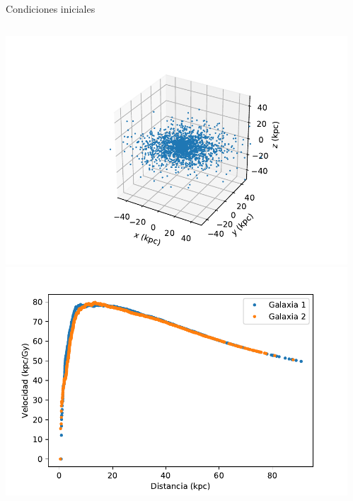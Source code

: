 \documentclass[handout]{beamer}
\begin{document}
\begin{frame}{Condiciones iniciales}
	\begin{columns}
		\begin{column}{0.5\textwidth}
			\includegraphics[height=0.35\textheight]{sources/images/galaxy_shape.pdf}\\\pause
			\includegraphics[height=0.35\textheight]{sources/images/rotation_curve.pdf}\pause
		\end{column}
		\begin{column}{0.65\textwidth}

\end{column}
\end{columns}
\end{frame}
\end{document}
